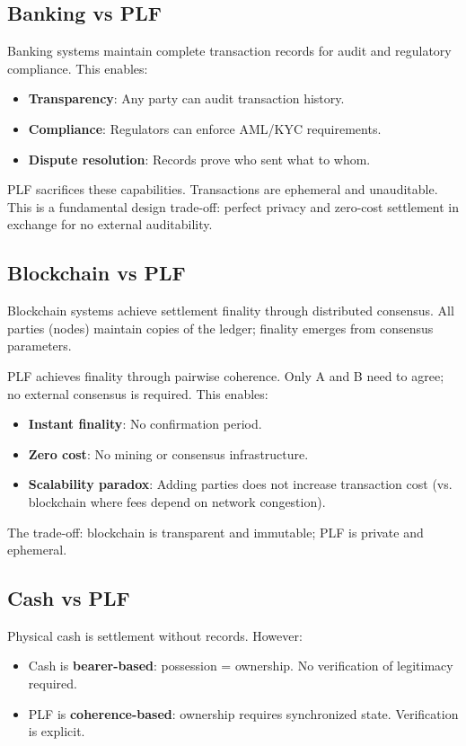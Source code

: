 \documentclass[twocolumn,10pt,a4paper]{article}
\theoremstyle{plain}
\theoremstyle{definition}
\begin{document}
\subsection{Banking vs PLF}

Banking systems maintain complete transaction records for audit and regulatory compliance. This enables:
\begin{itemize}
\item \textbf{Transparency}: Any party can audit transaction history.
\item \textbf{Compliance}: Regulators can enforce AML/KYC requirements.
\item \textbf{Dispute resolution}: Records prove who sent what to whom.
\end{itemize}

PLF sacrifices these capabilities. Transactions are ephemeral and unauditable. This is a fundamental design trade-off: perfect privacy and zero-cost settlement in exchange for no external auditability.

\subsection{Blockchain vs PLF}

Blockchain systems achieve settlement finality through distributed consensus. All parties (nodes) maintain copies of the ledger; finality emerges from consensus parameters.

PLF achieves finality through pairwise coherence. Only A and B need to agree; no external consensus is required. This enables:
\begin{itemize}
\item \textbf{Instant finality}: No confirmation period.
\item \textbf{Zero cost}: No mining or consensus infrastructure.
\item \textbf{Scalability paradox}: Adding parties does not increase transaction cost (vs. blockchain where fees depend on network congestion).
\end{itemize}

The trade-off: blockchain is transparent and immutable; PLF is private and ephemeral.

\subsection{Cash vs PLF}

Physical cash is settlement without records. However:
\begin{itemize}
\item Cash is \textbf{bearer-based}: possession = ownership. No verification of legitimacy required.
\item PLF is \textbf{coherence-based}: ownership requires synchronized state. Verification is explicit.
\end{itemize}
\end{document}
